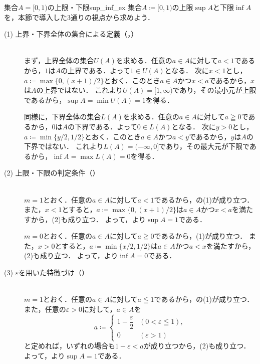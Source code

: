 \begin{example}{集合$A=[0,1)$の上限・下限}{sup_inf_ex}
  集合$A \coloneqq [0,1)$の上限$\sup A$と下限$\inf A$を，本節で導入した$3$通りの視点から求めよう．

  \begin{description}
    \item[(1) 上界・下界全体の集合による定義（，）]\mbox{}\\
      まず，上界全体の集合$U(A)$を求める．任意の$a \in A$に対して$a < 1$であるから，$1$は$A$の上界である．よって$1 \in U(A)$となる．
      次に$x < 1$とし，$a \coloneqq \max\{0,(x+1)/2\}$とおく．このとき$a \in A$かつ$x < a$であるから，$x$は$A$の上界ではない．
      これより$U(A) = [1, \infty)$であり，その最小元が上限であるから，$\sup A = \min U(A) = 1$を得る．

      同様に，下界全体の集合$L(A)$を求める．任意の$a \in A$に対して$a \geqq 0$であるから，$0$は$A$の下界である．よって$0 \in L(A)$となる．
      次に$y > 0$とし，$a \coloneqq \min\{y/2,1/2\}$とおく．このとき$a \in A$かつ$a < y$であるから，$y$は$A$の下界ではない．
      これより$L(A) = (-\infty, 0]$であり，その最大元が下限であるから，$\inf A = \max L(A) = 0$を得る．

    \item[(2) 上限・下限の判定条件（）]\mbox{}\\
      $m = 1$とおく．任意の$a \in A$に対して$a < 1$であるから，の(1)が成り立つ．
      また，$x < 1$とすると，$a \coloneqq \max\{0,(x+1)/2\}$は$a \in A$かつ$x < a$を満たすから，(2)も成り立つ．
      よって，より$\sup A = 1$である．

      $m = 0$とおく．任意の$a \in A$に対して$a \geqq 0$であるから，(1)が成り立つ．
      また，$x > 0$とすると，$a \coloneqq \min\{x/2,1/2\}$は$a \in A$かつ$a < x$を満たすから，(2)も成り立つ．
      よって，より$\inf A = 0$である．

    \item[(3) $\varepsilon$を用いた特徴づけ（）]\mbox{}\\
      $m = 1$とおく．任意の$a \in A$に対して$a \leqq 1$であるから，の(1)が成り立つ．
      また，任意の$\varepsilon > 0$に対して，$a \in A$を
      \[
        a \coloneqq
        \begin{cases}
          1 - \dfrac{\varepsilon}{2} & (0 < \varepsilon \leqq 1), \\[6pt]
          0 & (\varepsilon > 1)
        \end{cases}
      \]
      と定めれば，いずれの場合も$1 - \varepsilon < a$が成り立つから，(2)も成り立つ．
      よって，より$\sup A = 1$である．


\end{description}
\end{example}
